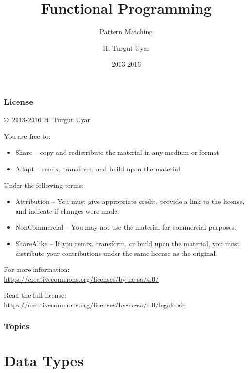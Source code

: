 \documentclass[dvipsnames]{beamer}
\title{Functional Programming}
\subtitle{Pattern Matching}
\author{H. Turgut Uyar}
\date{2013-2016}
\theoremstyle{plain}
\begin{document}
\begin{frame}
  \titlepage
\end{frame}

\begin{frame}
  \frametitle{License}

  \hfill
  \copyright~2013-2016 H. Turgut Uyar

  \vfill
  \begin{footnotesize}
    You are free to:
    \begin{itemize}
      \itemsep0em
      \item Share -- copy and redistribute the material in any medium or format
      \item Adapt -- remix, transform, and build upon the material
    \end{itemize}

    Under the following terms:
    \begin{itemize}
      \itemsep0em
      \item Attribution -- You must give appropriate credit, provide a link to
        the license, and indicate if changes were made.

      \item NonCommercial -- You may not use the material for commercial
        purposes.

      \item ShareAlike -- If you remix, transform, or build upon the material,
        you must distribute your contributions under the same license as the
        original.
    \end{itemize}

    For more information:\\
    \url{https://creativecommons.org/licenses/by-nc-sa/4.0/}

    \smallskip
    Read the full license:\\
    \url{https://creativecommons.org/licenses/by-nc-sa/4.0/legalcode}
  \end{footnotesize}
\end{frame}

\begin{frame}
  \frametitle{Topics}
  \tableofcontents
\end{frame}


\section{Data Types}
\end{document}
